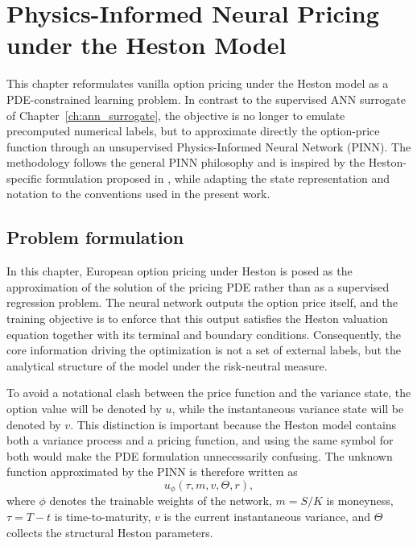 \chapter{Physics-Informed Neural Pricing under the Heston Model}
\label{ch:pinn_greeks}

This chapter reformulates vanilla option pricing under the Heston model as a PDE-constrained learning problem. In contrast to the supervised ANN surrogate of Chapter~\ref{ch:ann_surrogate}, the objective is no longer to emulate precomputed numerical labels, but to approximate directly the option-price function through an unsupervised Physics-Informed Neural Network (PINN). The methodology follows the general PINN philosophy and is inspired by the Heston-specific formulation proposed in \cite{hainaut2024pinn}, while adapting the state representation and notation to the conventions used in the present work.

\section{Problem formulation}

In this chapter, European option pricing under Heston is posed as the approximation of the solution of the pricing PDE rather than as a supervised regression problem. The neural network outputs the option price itself, and the training objective is to enforce that this output satisfies the Heston valuation equation together with its terminal and boundary conditions. Consequently, the core information driving the optimization is not a set of external labels, but the analytical structure of the model under the risk-neutral measure.

To avoid a notational clash between the price function and the variance state, the option value will be denoted by $u$, while the instantaneous variance state will be denoted by $v$. This distinction is important because the Heston model contains both a variance process and a pricing function, and using the same symbol for both would make the PDE formulation unnecessarily confusing. The unknown function approximated by the PINN is therefore written as
\[
u_\phi(\tau,m,v,\Theta,r),
\]
where $\phi$ denotes the trainable weights of the network, $m=S/K$ is moneyness, $\tau=T-t$ is time-to-maturity, $v$ is the current instantaneous variance, and $\Theta$ collects the structural Heston parameters.

